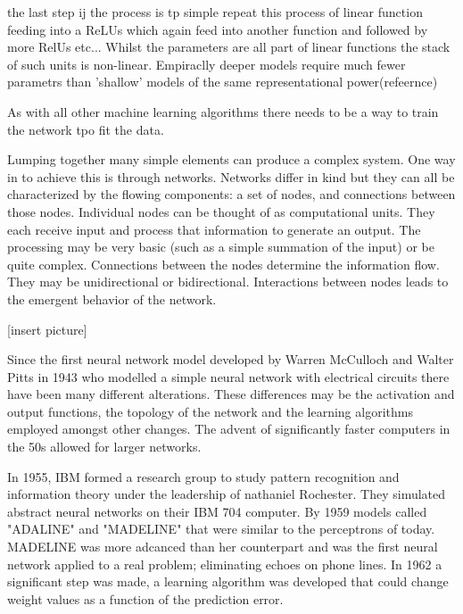 the last step ij the process is tp simple repeat this process of linear function feeding into a ReLUs which again feed into another function and followed by more RelUs etc...
Whilst the parameters are all part of linear functions the stack of such units is non-linear.
Empiraclly deeper models require much fewer parametrs than 'shallow' models of the same representational power(refeernce)

As with all other machine learning algorithms there needs to be a way to train the network tpo fit  the data.

Lumping together many simple elements can produce a complex system\citep{bar1997dynamics}.
One way in to achieve this is through networks.
Networks differ in kind but they can all be characterized by the flowing components: a set of nodes, and connections between those nodes\citep{gershenson2003artificial}.
Individual nodes can be thought of as computational units.
They each receive input and process that information to generate an output.
The processing may be very basic (such as a simple summation of the input) or be quite complex.
Connections between the nodes determine the information flow.
They may be unidirectional or bidirectional.
Interactions between nodes leads to the emergent behavior of the network.



[insert picture]



Since the first neural network model developed by Warren McCulloch and  Walter Pitts in 1943\citep{mcculloch1943logical} who modelled a simple neural network with electrical circuits there have been many different alterations\citep{bengio2009advances}.
These differences may be the activation and output functions, the topology of the network and the learning algorithms employed amongst other changes.
The advent of significantly faster computers in the 50s allowed for larger networks\citep{bengio2009advances}.

In 1955, IBM formed a research group to study pattern recognition and information theory under the leadership of nathaniel Rochester\citep{bengio2009advances}.
They simulated abstract neural networks on their IBM 704 computer.
By 1959 models called "ADALINE" and "MADELINE" that were similar to the perceptrons of today\citep{bengio2009advances}.
MADELINE was more adcanced than her counterpart and was the first neural network applied to a real problem; eliminating echoes on phone lines.
In 1962 a significant step was made, a learning algorithm was developed that could change weight values as a function of the prediction error\citep{bengio2009advances}.


